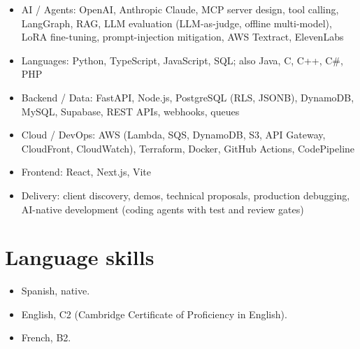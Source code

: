 \documentclass{article}
\begin{document}
\begin{itemize}
    \item AI / Agents: OpenAI, Anthropic Claude, MCP server design, tool calling, LangGraph, RAG, LLM evaluation (LLM-as-judge, offline multi-model), LoRA fine-tuning, prompt-injection mitigation, AWS Textract, ElevenLabs
    \item Languages: Python, TypeScript, JavaScript, SQL; also Java, C, C++, C\#, PHP
    \item Backend / Data: FastAPI, Node.js, PostgreSQL (RLS, JSONB), DynamoDB, MySQL, Supabase, REST APIs, webhooks, queues
    \item Cloud / DevOps: AWS (Lambda, SQS, DynamoDB, S3, API Gateway, CloudFront, CloudWatch), Terraform, Docker, GitHub Actions, CodePipeline
    \item Frontend: React, Next.js, Vite
    \item Delivery: client discovery, demos, technical proposals, production debugging, AI-native development (coding agents with test and review gates)
\end{itemize}

\section*{Language skills}

\begin{itemize}
    \item Spanish, native.
    \item English, C2 (Cambridge Certificate of Proficiency in English).
    \item French, B2.
\end{itemize}
\end{document}
